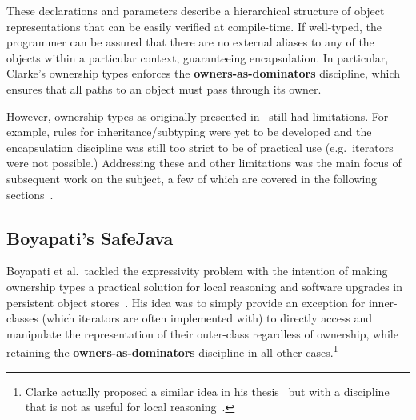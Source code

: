 \documentclass{acm_proc_article-sp}
\begin{document}
These declarations and parameters describe a hierarchical structure of object
representations that can be easily verified at compile-time. If well-typed, the
programmer can be assured that there are no external aliases to any of the
objects within a particular context, guaranteeing encapsulation. In particular,
Clarke's ownership types enforces the \textbf{owners-as-dominators} discipline,
which ensures that all paths to an object must pass through its owner.

However, ownership types as originally presented in~\cite{clarke98ownership}
still had limitations. For example, rules for inheritance/subtyping were yet to
be developed and the encapsulation discipline was still too strict to be of
practical use (e.g.\ iterators were not possible.) Addressing these and other
limitations was the main focus of subsequent work on the subject, a few of
which are covered in the following sections~\cite{boyapati04safejava,
boyapati03innerclass, cunningham08ut, dietl11gut, cameron07mojo}.

%
%
%


\subsection{Boyapati's SafeJava}
\label{subsec:boyapati}

Boyapati et al.\ tackled the expressivity problem with the intention of making
ownership types a practical solution for local reasoning and software upgrades
in persistent object stores~\cite{boyapati03innerclass}. His idea was to simply
provide an exception for inner-classes (which iterators are often implemented
with) to directly access and manipulate the representation of their outer-class
regardless of ownership, while retaining the \textbf{owners-as-dominators}
discipline in all other cases.\footnote{Clarke actually proposed a similar idea
in his thesis~\cite{clarke03ownership} but with a discipline that is not as
useful for local reasoning~\cite{boyapati03innerclass}.}
\end{document}
